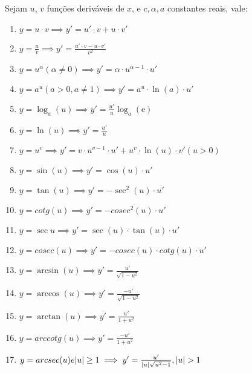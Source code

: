 \documentclass{article}
\begin{document}
Sejam $u$, $v$ funções deriváveis de $x$, e $c, \alpha, a$ constantes reais, vale:
\begin{enumerate}
  \item $y = u \cdot v \implies  y' = u' \cdot v + u \cdot v'$ \\
  \item $y = \frac{u}{v} \implies y' = \frac{u'\cdot v - u \cdot v'}{v^2}$ \\
  \item $y = u^\alpha (\alpha \neq 0) \implies y' = \alpha \cdot u^{\alpha-1} \cdot u'$ \\
  \item $y = a^u (a>0,a\neq 1) \implies y' = a^u \cdot \ln(a) \cdot u'$ \\
  \item $y = \log_a (u) \implies y' = \frac{u'}{u} \log_a (\mathrm{e})$ \\
  \item $y = \ln(u) \implies y' = \frac{u'}{u}$ \\  
  \item $y = u^v \implies y' = v \cdot u^{v-1}\cdot u' + u^v \cdot \ln(u) \cdot v' (u>0)$ \\
  \item $y = \sin(u) \implies y' = \cos(u) \cdot u'$ \\
  \item $y = \tan(u) \implies y' = -\sec^2(u) \cdot u'$\\
  \item $y = cotg(u) \implies y' = -cosec^2(u) \cdot u'$\\
  \item $y = \sec u \implies y' = \sec(u) \cdot \tan(u) \cdot u'$\\
  \item $y = cosec(u) \implies y' = -cosec(u) \cdot cotg(u) \cdot u'$\\
  \item $y = \arcsin(u) \implies y' = \frac{u'}{\sqrt{1-u^2}}$\\
  \item $y = \arccos(u) \implies y' = \frac{-u'}{\sqrt{1-u^2}}$\\
  \item $y = \arctan(u) \implies y' = \frac{u'}{1+u^2} $\\
  \item $y = arccotg(u) \implies y' = \frac{-u'}{1+u^2}$\\
  \item $y = arcsec(u)  e  \abs{u} \geq 1 \implies y' = \frac{u'}{\abs{u}\sqrt{u^2 - 1}}, \abs{u} > 1$\\
\end{enumerate}
\end{document}
